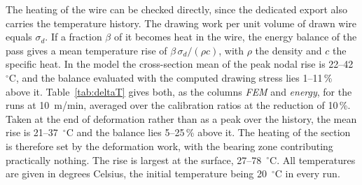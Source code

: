 The heating of the wire can be checked directly, since the dedicated export also carries the
temperature history. The drawing work per unit volume of drawn wire equals $\sigma_d$. If a
fraction $\beta$ of it becomes heat in the wire, the energy balance of the pass gives a mean
temperature rise of $\beta\,\sigma_d/(\rho c)$, with $\rho$ the density and $c$ the specific heat.
In the model the cross-section mean of the peak nodal rise is 22--42~$^\circ$C, and the balance
evaluated with the computed drawing stress lies 1--11\,\% above it. Table~\ref{tab:deltaT} gives
both, as the columns \emph{FEM} and \emph{energy}, for the runs at 10~m/min, averaged over the
calibration ratios at the reduction of 10\,\%. Taken at the end of deformation rather than as a
peak over the history, the mean rise is 21--37~$^\circ$C and the balance lies 5--25\,\% above it.
The heating of the section is therefore set by the deformation work, with the bearing zone
contributing practically nothing. The rise is largest at the surface, 27--78~$^\circ$C. All
temperatures are given in degrees Celsius, the initial temperature being 20~$^\circ$C in every run.

